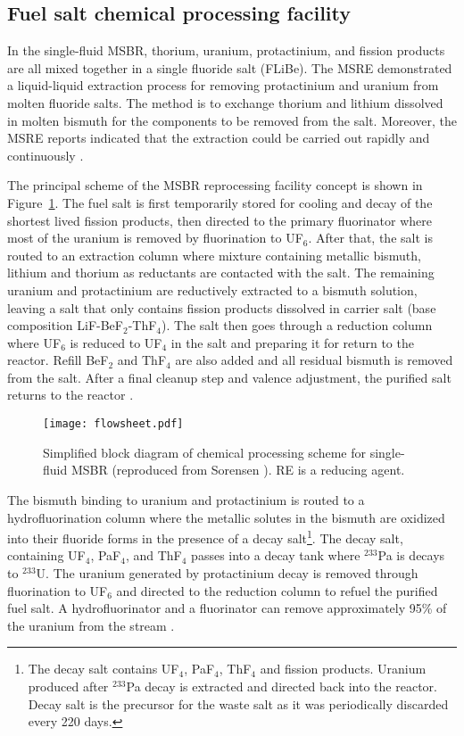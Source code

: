 \subsection{Fuel salt chemical processing facility} \label{sec:chemical_processing}
In the single-fluid \gls{MSBR}, thorium, uranium, 
protactinium, and fission products are all mixed together in a single fluoride salt (FLiBe). The \gls{MSRE} demonstrated a liquid-liquid extraction process 
for removing protactinium and uranium from molten fluoride salts. The method 
is to exchange thorium and lithium dissolved in molten bismuth for the 
components to be removed from the salt. Moreover, the \gls{MSRE} reports 
indicated that the extraction could be carried out rapidly and continuously 
\cite{whatley_engineering_1970-1}.

The principal scheme of the \gls{MSBR} reprocessing facility concept is shown in Figure~\ref{fig:material_flow}. The fuel salt is first temporarily stored for cooling and decay of the shortest lived fission products, then directed to the primary fluorinator where most of the uranium is removed by fluorination to UF$_6$. After that, the salt is routed to an extraction column where mixture containing metallic bismuth, lithium and thorium as reductants are contacted with the salt. The remaining uranium and protactinium are reductively extracted to a bismuth solution, leaving a salt that only contains fission products dissolved in carrier salt (base composition LiF-BeF$_2$-ThF$_4$). The salt then goes through a reduction column where UF$_6$ is reduced to UF$_4$ in the salt and preparing it for return to the reactor. Refill BeF$_2$ and ThF$_4$ are also added and all residual bismuth is removed from the salt. After a final cleanup step and valence adjustment, the purified salt returns to the reactor \cite{carter_design_1972,sorensen_one-fluid_2006}.
\begin{figure}[htp!] %
  \centering
  \texttt{[image: flowsheet.pdf]}
  \caption{Simplified block diagram of chemical processing scheme for single-fluid \gls{MSBR} (reproduced 
  from Sorensen \cite{sorensen_one-fluid_2006}). RE is a reducing agent.}
  \label{fig:material_flow}
\end{figure}

The bismuth binding to uranium and protactinium is routed to a hydrofluorination column where the metallic solutes in the bismuth are oxidized into their fluoride forms in the presence of a decay salt\footnote{The decay salt contains UF$_4$, PaF$_4$, ThF$_4$ and fission products. Uranium produced after $^{233}$Pa decay is extracted and directed back into the reactor. Decay salt is the precursor for the waste salt as it was periodically discarded every 220 days.}. The decay salt, containing UF$_4$, PaF$_4$, and ThF$_4$ passes into a decay tank where $^{233}$Pa is decays to $^{233}$U. The uranium generated by protactinium decay is removed through fluorination to UF$_6$ and directed to the reduction column to refuel the purified fuel salt. A hydrofluorinator and a fluorinator can remove approximately 95\% of the uranium from the stream 
\cite{robertson_conceptual_1971}.

